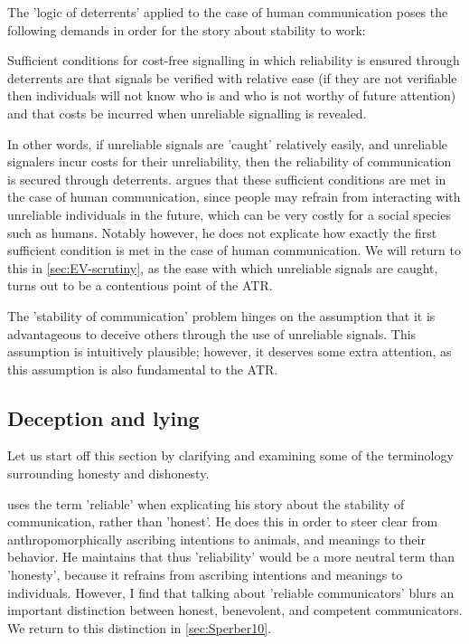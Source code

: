 The 'logic of deterrents' applied to the case of human communication poses the following demands in order for the story about stability to work:
\begin{quoting}
    Sufficient conditions for cost-free signalling in which reliability is ensured through deterrents are that signals be verified with relative ease (if they are not verifiable then individuals will not know who is and who is not worthy of future attention) and that costs be incurred when unreliable signalling is revealed.
    \hfill \citep[p.~279]{Scott-Phillips08}
\end{quoting}
In other words, if unreliable signals are 'caught' relatively easily, and unreliable signalers incur costs for their unreliability, then the reliability of communication is secured through deterrents.
\citet{Scott-Phillips08} argues that these sufficient conditions are met in the case of human communication, since people may refrain from interacting with unreliable individuals in the future, which can be very costly for a social species such as humans.
Notably however, he does not explicate how exactly the first sufficient condition is met in the case of human communication. We will return to this in \cref{sec:EV-scrutiny}, as the ease with which unreliable signals are caught, turns out to be a contentious point of the ATR.

The 'stability of communication' problem hinges on the assumption that it is advantageous to deceive others through the use of unreliable signals. This assumption is intuitively plausible; however, it deserves some extra attention, as this assumption is also fundamental to the ATR.

\subsection{Deception and lying}
\label{sec:deception}

Let us start off this section by clarifying and examining some of the terminology surrounding honesty and dishonesty.

\citet{Scott-Phillips08} uses the term 'reliable' when explicating his story about the stability of communication, rather than 'honest'.
He does this in order to steer clear from anthropomorphically ascribing intentions to animals, and meanings to their behavior. He maintains that thus 'reliability' would be a more neutral term than 'honesty', because it refrains from ascribing intentions and meanings to individuals.
However, I find that talking about 'reliable communicators' blurs an important distinction between honest, benevolent, and competent communicators. We return to this distinction in \cref{sec:Sperber10}.

